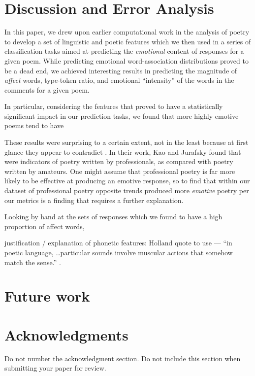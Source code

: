 \documentclass[11pt]{article}
\begin{document}
\section{Discussion and Error Analysis}
In this paper, we drew upon earlier computational work in the analysis of poetry to develop a set of linguistic and poetic features which we then used in a series of classification tasks aimed at predicting the \emph{emotional} content of responses for a given poem. While predicting emotional word-association distributions proved to be a dead end, we achieved interesting results in predicting the magnitude of \emph{affect} words, type-token ratio, and emotional ``intensity'' %
 of the words in the comments for a given poem.

In particular, considering the features that proved to have a statistically significant impact in our prediction tasks, we found that more highly emotive poems tend to have %

These results were surprising to a certain extent, not in the least because at first glance they appear to contradict . In their work, Kao and Jurafsky found that %
 were indicators of poetry written by professionals, as compared with poetry written by amateurs. One might assume that professional poetry is far more likely to be effective at producing an emotive response, so to find that within our dataset of professional poetry opposite trends produced more \emph{emotive} poetry per our metrics is a finding that requires a further explanation.

Looking by hand at the sets of responses which we found to have a high proportion of affect words, %

justification / explanation of phonetic features: 
   Holland quote to use --- ``in poetic language, \dots particular sounds involve muscular actions that somehow match the sense.'' \cite{holland1989dynamics}.


\section{Future work}



\section*{Acknowledgments}

Do not number the acknowledgment section. Do not include this section when submitting your paper for review.




\end{document}
